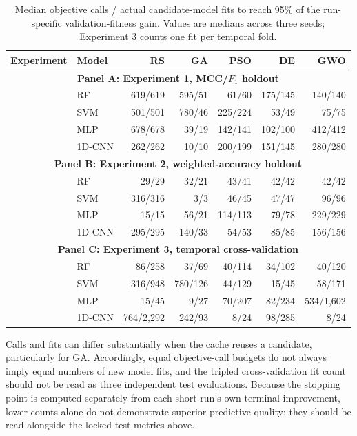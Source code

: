 \begin{table}[!htbp]
\centering
\caption{Median objective calls / actual candidate-model fits to reach 95\% of the run-specific validation-fitness gain. Values are medians across three seeds; Experiment 3 counts one fit per temporal fold.}
\label{tab:training_effort}
\manuscripttablestyle
\begin{tabular}{llrrrrr}\toprule
\textbf{Experiment} & \textbf{Model} & \textbf{RS} & \textbf{GA} & \textbf{PSO} & \textbf{DE} & \textbf{GWO}\\\midrule
\multicolumn{7}{c}{\textbf{Panel A: Experiment 1, MCC/$F_1$ holdout}}\\\midrule
 & RF & 619/619 & 595/51 & 61/60 & 175/145 & 140/140\\
 & SVM & 501/501 & 780/46 & 225/224 & 53/49 & 75/75\\
 & MLP & 678/678 & 39/19 & 142/141 & 102/100 & 412/412\\
 & 1D-CNN & 262/262 & 10/10 & 200/199 & 151/145 & 280/280\\\midrule
\multicolumn{7}{c}{\textbf{Panel B: Experiment 2, weighted-accuracy holdout}}\\\midrule
 & RF & 29/29 & 32/21 & 43/41 & 42/42 & 42/42\\
 & SVM & 316/316 & 3/3 & 46/45 & 47/47 & 96/96\\
 & MLP & 15/15 & 56/21 & 114/113 & 79/78 & 229/229\\
 & 1D-CNN & 295/295 & 140/33 & 54/53 & 85/85 & 156/156\\\midrule
\multicolumn{7}{c}{\textbf{Panel C: Experiment 3, temporal cross-validation}}\\\midrule
 & RF & 86/258 & 37/69 & 40/114 & 34/102 & 40/120\\
 & SVM & 316/948 & 780/126 & 44/129 & 15/45 & 58/171\\
 & MLP & 15/45 & 9/27 & 70/207 & 82/234 & 534/1,602\\
 & 1D-CNN & 764/2,292 & 242/93 & 8/24 & 98/285 & 8/24\\\bottomrule
\end{tabular}
\end{table}

Calls and fits can differ substantially when the cache reuses a candidate, particularly for GA. Accordingly, equal objective-call budgets do not always imply equal numbers of new model fits, and the tripled cross-validation fit count should not be read as three independent test evaluations. Because the stopping point is computed separately from each short run's own terminal improvement, lower counts alone do not demonstrate superior predictive quality; they should be read alongside the locked-test metrics above.

